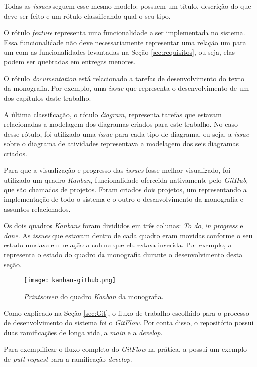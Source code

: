 Todas as \textit{issues} seguem esse mesmo modelo: possuem um título, descrição do que deve ser feito e um rótulo classificando qual o seu tipo.

O rótulo \textit{feature} representa uma funcionalidade a ser implementada no sistema. Essa funcionalidade não deve necessariamente representar uma relação um para um com as funcionalidades levantadas na Seção \ref{sec:requisitos}, ou seja, elas podem ser quebradas em entregas menores.

O rótulo \textit{documentation} está relacionado a tarefas de desenvolvimento do texto da monografia. Por exemplo, uma \textit{issue} que representa o desenvolvimento de um dos capítulos deste trabalho.

A última classificação, o rótulo \textit{diagram}, representa tarefas que estavam relacionadas a modelagem dos diagramas criados para este trabalho. No caso desse rótulo, foi utilizado uma \textit{issue} para cada tipo de diagrama, ou seja, a \textit{issue} sobre o diagrama de atividades representava a modelagem dos seis diagramas criados. 

Para que a visualização e progresso das \textit{issues} fosse melhor visualizado, foi utilizado um quadro \textit{Kanban}, funcionalidade oferecida nativamente pelo \textit{GitHub}, que são chamados de projetos. Foram criados dois projetos, um representando a implementação de todo o sistema e o outro o desenvolvimento da monografia e assuntos relacionados.

Os dois quadros \textit{Kanbans} foram divididos em três colunas: \textit{To do}, \textit{in progress} e \textit{done}. As \textit{issues} que estavam dentro de cada quadro eram movidas conforme o seu estado mudava em relação a coluna que ela estava inserida. Por exemplo, a  representa o estado do quadro da monografia durante o desenvolvimento desta seção.

\begin{figure}[!htb]
  \centering
  \texttt{[image: kanban-github.png]}
  \caption{\textit{Printscreen} do quadro \textit{Kanban} da monografia.}
  \label{fig:kanbanmono}
\end{figure}

Como explicado na Seção \ref{sec:Git}, o fluxo de trabalho escolhido para o processo de desenvolvimento do sistema foi o \textit{GitFlow}. Por conta disso, o repositório possui duas ramificações de longa vida, a \textit{main} e a \textit{develop}.

Para exemplificar o fluxo completo do \textit{GitFlow} na prática, a  possui um exemplo de \textit{pull request} para a ramificação \textit{develop}.

